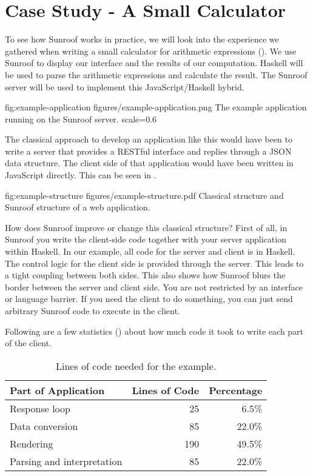  
\section{Case Study - A Small Calculator}
\label{sec:extended-example}

To see how Sunroof works in practice, we will look into the 
experience we gathered when writing a small calculator
for arithmetic expressions (). 
We use Sunroof to display our interface
and the results of our computation. Haskell will be used to parse the 
arithmetic expressions and calculate the result. The Sunroof server 
will be used to implement this JavaScript/Haskell hybrid.

\FigureS%
{fig:example-application}%
{figures/example-application.png}%
{The example application running on the Sunroof server.}%
{scale=0.6}

The classical approach to develop an application like this would have 
been to write a server that provides a RESTful interface and replies 
through a JSON data structure. 
The client side of that application would have been written in JavaScript
directly.
This can be seen in .

\Figure%
{fig:example-structure}%
{figures/example-structure.pdf}%
{Classical structure and Sunroof structure of a web application.}

How does Sunroof improve or change this classical structure?
First of all, in Sunroof you write the client-side code together with
your server application within Haskell. In our example, all code 
for the server and client is in Haskell. The control logic 
for the client side is provided through the server.
This leads to a tight coupling between both sides. 
This also shows how Sunroof blurs the border between the server 
and client side. You are not restricted by an interface or language 
barrier. If you need the client to do something, you can just 
send arbitrary Sunroof code to execute in the client.

Following are a few statistics () 
about how much code it took to write each part of the client.

\begin{table}[t]
\begin{center}
\begin{tabular}{l@{\quad}r@{\quad}r}
\hline\rule{0pt}{12pt}%
Part of Application & Lines of Code & Percentage \\[2pt]
\hline\rule{0pt}{12pt}%
Response loop & 25 & 6.5\% \\[2pt]
Data conversion & 85 & 22.0\% \\[2pt]
Rendering & 190 & 49.5\% \\[2pt]
Parsing and interpretation & 85 & 22.0\% \\[2pt]
\hline
\end{tabular}
\end{center}
\caption{Lines of code needed for the example.}
\label{tab:example-statistics}
\vspace{-0.5cm}
\end{table} 

